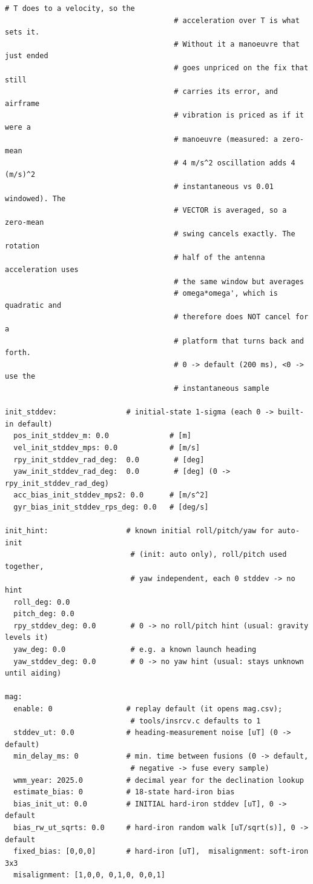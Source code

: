 \documentclass[11pt,a4paper]{article}
\begin{document}
\begin{lstlisting}[style=cfg]
                                       # T does to a velocity, so the
                                       # acceleration over T is what sets it.
                                       # Without it a manoeuvre that just ended
                                       # goes unpriced on the fix that still
                                       # carries its error, and airframe
                                       # vibration is priced as if it were a
                                       # manoeuvre (measured: a zero-mean
                                       # 4 m/s^2 oscillation adds 4 (m/s)^2
                                       # instantaneous vs 0.01 windowed). The
                                       # VECTOR is averaged, so a zero-mean
                                       # swing cancels exactly. The rotation
                                       # half of the antenna acceleration uses
                                       # the same window but averages
                                       # omega*omega', which is quadratic and
                                       # therefore does NOT cancel for a
                                       # platform that turns back and forth.
                                       # 0 -> default (200 ms), <0 -> use the
                                       # instantaneous sample

init_stddev:                # initial-state 1-sigma (each 0 -> built-in default)
  pos_init_stddev_m: 0.0              # [m]
  vel_init_stddev_mps: 0.0            # [m/s]
  rpy_init_stddev_rad_deg:  0.0        # [deg]
  yaw_init_stddev_rad_deg:  0.0        # [deg] (0 -> rpy_init_stddev_rad_deg)
  acc_bias_init_stddev_mps2: 0.0      # [m/s^2]
  gyr_bias_init_stddev_rps_deg: 0.0   # [deg/s]

init_hint:                  # known initial roll/pitch/yaw for auto-init
                             # (init: auto only), roll/pitch used together,
                             # yaw independent, each 0 stddev -> no hint
  roll_deg: 0.0
  pitch_deg: 0.0
  rpy_stddev_deg: 0.0        # 0 -> no roll/pitch hint (usual: gravity levels it)
  yaw_deg: 0.0               # e.g. a known launch heading
  yaw_stddev_deg: 0.0        # 0 -> no yaw hint (usual: stays unknown until aiding)

mag:
  enable: 0                 # replay default (it opens mag.csv);
                             # tools/insrcv.c defaults to 1
  stddev_ut: 0.0            # heading-measurement noise [uT] (0 -> default)
  min_delay_ms: 0           # min. time between fusions (0 -> default,
                             # negative -> fuse every sample)
  wmm_year: 2025.0          # decimal year for the declination lookup
  estimate_bias: 0          # 18-state hard-iron bias
  bias_init_ut: 0.0         # INITIAL hard-iron stddev [uT], 0 -> default
  bias_rw_ut_sqrts: 0.0     # hard-iron random walk [uT/sqrt(s)], 0 -> default
  fixed_bias: [0,0,0]       # hard-iron [uT],  misalignment: soft-iron 3x3
  misalignment: [1,0,0, 0,1,0, 0,0,1]


\end{lstlisting}
\end{document}
